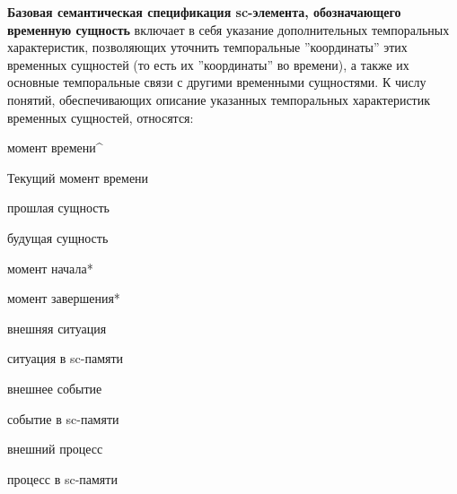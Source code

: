 \textbf{Базовая семантическая спецификация sc-элемента, обозначающего временную сущность} включает в себя указание дополнительных темпоральных характеристик, позволяющих уточнить темпоральные ''координаты'' этих временных сущностей (то есть их ''координаты'' во времени), а также их основные темпоральные связи с другими временными сущностями. К числу понятий, обеспечивающих описание указанных темпоральных характеристик временных сущностей, относятся:
\begin{textitemize}
	\item момент времени\textasciicircum
	\item Текущий момент времени
	\item прошлая сущность
	\item будущая сущность 
	\item момент начала*
	\item момент завершения*
	\item внешняя ситуация
	\item ситуация в sc-памяти
	\item внешнее событие
	\item событие в sc-памяти
	\item внешний процесс
	\item процесс в sc-памяти
\end{textitemize}

\vskip 5cm

\begin{SCn}
\end{SCn}


